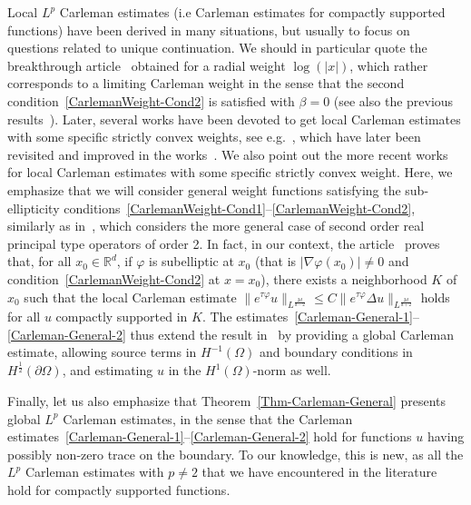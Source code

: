 \documentclass[10pt]{amsart}
\theoremstyle{definition}\newtheorem{defi}[theo]{Definition}\newtheorem{rema}[theo]{Remark}\newtheorem{exam}[theo]{Example}\newtheorem{exem}[theo]{Example}\newtheorem{nota}[theo]{Notation}
\newcommand*\R{\mathbb{R}}
\renewcommand{\leq}{\leqslant}
\begin{document}
Local $L^p$ Carleman estimates (i.e Carleman estimates for compactly supported functions) have been derived in many situations, but usually to focus on questions related to unique continuation. We should in particular quote the breakthrough article~\cite{jerison1985unique} obtained for a radial weight $\log(|x|)$, which rather corresponds to a limiting Carleman weight in the sense that the second condition~\eqref{CarlemanWeight-Cond2} is satisfied with $\beta = 0$ (see also the previous results~\cite{Amrein-Berthier-Georgescu-1981, Hormander-Uniqueness-1983}). Later, several works have been devoted to get local Carleman estimates with some specific strictly convex weights, see e.g.~\cite{barcelo1988weighted,Sogge1989uniquecontinuation,Sogge.Strong.Elliptic1990}, which have later been revisited and improved in the works~\cite{koch2001carleman,ferreira2003sharp}. We also point out the more recent works~\cite{davey2020quantitative,davey2019quantitative} for local Carleman estimates with some specific strictly convex weight. Here, we emphasize that we will consider general weight functions satisfying the sub-ellipticity conditions~\eqref{CarlemanWeight-Cond1}--\eqref{CarlemanWeight-Cond2}, similarly as in~\cite{ferreira2003sharp}, which considers the more general case of second order real principal type operators of order 2. In fact, in our context, the article~\cite{ferreira2003sharp} proves that, for all $x_0 \in \R^d$, if $\varphi$ is subelliptic at $x_0$ (that is $|\nabla \varphi(x_0)| \neq 0$ and condition~\eqref{CarlemanWeight-Cond2} at $x = x_0$), there exists a neighborhood $K$ of $x_0$ such that the local Carleman estimate $\| e^{\tau \varphi} u \|_{L^{\frac{2d}{d-2}}} \leq C \| e^{\tau \varphi} \Delta u \|_{L^{\frac{2d}{d+2}}}$ holds for all $u$ compactly supported in $K$. The estimates~\eqref{Carleman-General-1}--\eqref{Carleman-General-2} thus extend the result in~\cite{ferreira2003sharp} by providing a global Carleman estimate, allowing source terms in $H^{-1}(\Omega)$ and boundary conditions in $H^{\frac{1}{2}}(\partial \Omega)$, and estimating $u$ in the $H^1(\Omega)$-norm as well.

Finally, let us also emphasize that Theorem~\ref{Thm-Carleman-General} presents global $L^p$ Carleman estimates, in the sense that the Carleman estimates~\eqref{Carleman-General-1}--\eqref{Carleman-General-2} hold for functions $u$ having possibly non-zero trace on the boundary. To our knowledge, this is new, as all the $L^p$ Carleman estimates with $p \neq 2$ that we have encountered in the literature hold for compactly supported functions.
\end{document}
